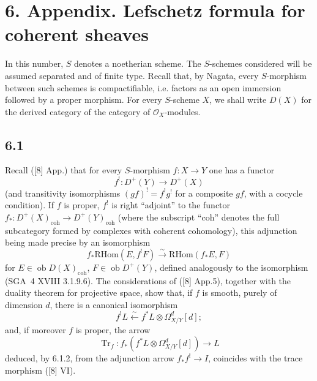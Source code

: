 \documentclass[11pt]{article}
\providecommand{\cO}{\mathcal{O}}
\providecommand{\RHom}{\mathrm{RHom}}
\providecommand{\RHom}{\mathrm{RHom}}
\providecommand{\RHom}{\mathrm R\mathcal{H}om}
\begin{document}
\section*{6. Appendix. Lefschetz formula for coherent sheaves}

In this number, $S$ denotes a noetherian scheme. The $S$-schemes considered will be assumed separated and of finite type. Recall that, by Nagata, every $S$-morphism between such schemes is compactifiable, i.e. factors as an open immersion followed by a proper morphism. For every $S$-scheme $X$, we shall write $D(X)$ for the derived category of the category of $\cO_X$-modules.

\subsection*{6.1}
Recall ([8] App.) that for every $S$-morphism $f:X\to Y$ one has a functor
\[
f^!:D^+(Y)\longrightarrow D^+(X)
\]
(and transitivity isomorphisms $(gf)^! = f^!g^!$ for a composite $gf$, with a cocycle condition). If $f$ is proper, $f^!$ is right ``adjoint'' to the functor $f_*:D^+(X)_{\mathrm{coh}}\to D^+(Y)_{\mathrm{coh}}$ (where the subscript ``coh'' denotes the full subcategory formed by complexes with coherent cohomology), this adjunction being made precise by an isomorphism
\begin{equation}
\tag{6.1.1}
f_*\RHom(E,f^!F)\xrightarrow{\sim}\RHom(f_*E,F)
\end{equation}
for $E\in\operatorname{ob}D(X)_{\mathrm{coh}}$, $F\in\operatorname{ob}D^+(Y)$, defined analogously to the isomorphism (SGA~4 XVIII 3.1.9.6). The considerations of ([8] App.5), together with the duality theorem for projective space, show that, if $f$ is smooth, purely of dimension $d$, there is a canonical isomorphism
\begin{equation}
\tag{6.1.2}
f^!L\xleftarrow{\sim} f^*L\otimes\Omega^d_{X/Y}[d];
\end{equation}
and, if moreover $f$ is proper, the arrow
\begin{equation}
\tag{6.1.3}
\operatorname{Tr}_f:f_*(f^*L\otimes\Omega^d_{X/Y}[d])\longrightarrow L
\end{equation}
deduced, by 6.1.2, from the adjunction arrow $f_*f^!\to I$, coincides with the trace morphism ([8] VI).
\end{document}
